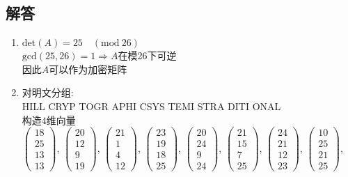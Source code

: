 \documentclass[12pt]{article}
\begin{document}
\subsection*{解答}
\begin{enumerate}
\item
$\textrm{det}(A)=25\quad(\mathrm{mod}~26)$\\
$\mathrm{gcd}(25, 26)=1\Longrightarrow A$在模26下可逆\\
因此$A$可以作为加密矩阵\\

\item
对明文分组:\\
HILL CRYP TOGR APHI CSYS TEMI STRA DITI ONAL\\
构造$4$维向量\\
$\begin{pmatrix}18\\25\\13\\13\end{pmatrix}$,
$\begin{pmatrix}20\\12\\9\\19\end{pmatrix}$,
$\begin{pmatrix}21\\1\\4\\12\end{pmatrix}$,
$\begin{pmatrix}23\\19\\18\\25\end{pmatrix}$,
$\begin{pmatrix}20\\24\\9\\24\end{pmatrix}$,
$\begin{pmatrix}21\\15\\7\\25\end{pmatrix}$,
$\begin{pmatrix}24\\21\\12\\23\end{pmatrix}$,
$\begin{pmatrix}10\\25\\21\\25\end{pmatrix}$,

\end{enumerate}
\end{document}
